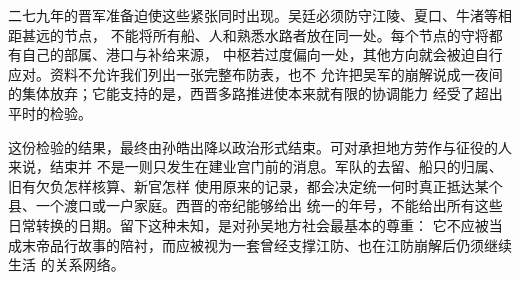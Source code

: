 二七九年的晋军准备迫使这些紧张同时出现。吴廷必须防守江陵、夏口、牛渚等相距甚远的节点，
不能将所有船、人和熟悉水路者放在同一处。每个节点的守将都有自己的部属、港口与补给来源，
中枢若过度偏向一处，其他方向就会被迫自行应对。资料不允许我们列出一张完整布防表，也不
允许把吴军的崩解说成一夜间的集体放弃；它能支持的是，西晋多路推进使本来就有限的协调能力
经受了超出平时的检验。

这份检验的结果，最终由孙皓出降以政治形式结束。可对承担地方劳作与征役的人来说，结束并
不是一则只发生在建业宫门前的消息。军队的去留、船只的归属、旧有欠负怎样核算、新官怎样
使用原来的记录，都会决定统一何时真正抵达某个县、一个渡口或一户家庭。西晋的帝纪能够给出
统一的年号，不能给出所有这些日常转换的日期。留下这种未知，是对孙吴地方社会最基本的尊重：
它不应被当成末帝品行故事的陪衬，而应被视为一套曾经支撑江防、也在江防崩解后仍须继续生活
的关系网络。
